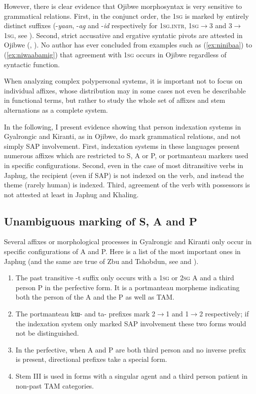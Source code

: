 \documentclass[oldfontcommands,oneside,a4paper,11pt]{article}
\newcommand{\ipa}[1]{{\phon \mbox{#1}}} %
\begin{document}
However, there is clear evidence that Ojibwe morphosyntax is very sensitive to grammatical relations. First, in the conjunct order, the \textsc{1sg} is marked by entirely distinct suffixes (-\textit{yaan}, -\textit{ag} and -\textit{id} respectively for \textsc{1sg.intr}, \textsc{1sg}$\rightarrow$3 and  3$\rightarrow$\textsc{1sg}, see \citealt[295]{valentine01grammar}). Second, strict accusative and ergative syntatic pivots are attested in Ojibwe (\citealt{rhodes94valency}, \citealt[119-126]{zuniga06}). No author has ever concluded from examples such as (\ref{ex:ninibaa}) to (\ref{ex:niwaabamig}) that agreement with \textsc{1sg} occurs in Ojibwe  regardless of syntactic function.

When analyzing complex polypersonal systems, it is important not to focus on individual affixes, whose distribution may in some cases not even be describable in functional terms, but rather to study the whole set of affixes and stem alternations as a complete system. 

In the following, I present evidence showing that person indexation systems in Gyalrongic and Kiranti, as in Ojibwe, do mark grammatical relations, and not simply SAP involvement. First, indexation systems in these languages present numerous affixes which are restricted to S, A or P, or portmanteau markers used in specific configurations. Second, even in the case of most ditransitive verbs in Japhug, the recipient (even if SAP) is not indexed on the verb, and instead the theme (rarely human) is indexed. Third, agreement of the verb with possessors is not attested at least in Japhug and Khaling.

\subsection{Unambiguous marking of S, A and P}
Several affixes or morphological processes in Gyalrongic and Kiranti only occur  in specific configurations of A and P. Here is a list of the most important ones in Japhug (and the same are true of Zbu and Tshobdun, see \citealt{jackson00sidaba, jackson02rentongdengdi} and \citealt{gongxun14agreement}).

\begin{enumerate}
\item The past transitive \ipa{-t} suffix only occurs with a \textsc{1sg} or \textsc{2sg} A and a third person P in the perfective form. It is a portmanteau morpheme indicating both the person of the A and the P as well as TAM.
\item The portmanteau \ipa{kɯ-} and \ipa{ta-} prefixes mark 2$\rightarrow$1 and 1$\rightarrow$2 respectively; if the indexation system only marked SAP involvement these two forms would not be distinguished.
\item In the perfective, when A and P are both third person and no inverse prefix is present, directional prefixes take a special form.
\item Stem III is used in forms with a singular agent and a third person patient in non-past TAM categories.
\end{enumerate}
\end{document}
